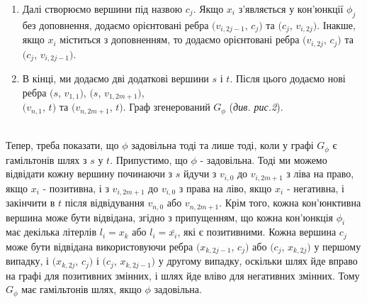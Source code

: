 \documentclass[14pt]{article}
\begin{document}
\begin{spacing}{1.175}
\begin{enumerate}
        \item  Далі створюємо вершини під назвою \(c_{j}\). Якщо \(x_i\) з'являється у кон'юнкції \(\phi_{j}\) без доповнення, додаємо орієнтовані ребра
        \((v_{i,2j-1}\), \(c_{j})\) та \((c_{j}\), \(v_{i,2j})\). Інакше, якщо \(x_i\) міститься з доповненням, то додаємо орієнтовані ребра \((v_{i,2j}\), \(c_{j})\) та \((c_{j}\), \(v_{i,2j-1})\).
        
        \item В кінці, ми додаємо дві додаткові вершини \(s\) і \(t\). Після цього додаємо нові ребра \((s\), \(v_{1,1})\), \((s\), \(v_{1,2m+1})\), \\\((v_{n,1}\), \(t)\) та \((v_{n,2m+1}\), \(t)\). Граф згенерований \(G_{\phi}\) (\textit{див. рис.2}).
    \end{enumerate}
    \\

    \quad Тепер, треба показати, що \(\phi\) задовільна тоді та лише тоді, коли у графі \(G_{\phi}\) є гамільтонів шлях з \(s\) у \(t\). Припустимо, що \(\phi\) - задовільна. Тоді ми можемо відвідати кожну вершину починаючи з \(s\) йдучи з \(v_{i,0}\) до \(v_{i,2m+1}\) з ліва на право, якщо \(x_i\) - позитивна, і з \(v_{i,2m+1}\) до \(v_{i,0}\) з права на ліво, якщо \(x_i\) - негативна, і закінчити в \(t\) після відвідування \(v_{n,0}\) або \(v_{n,2m+1}\). Крім того, кожна кон'юнктивна вершина може бути відвідана, згідно з припущенням, що кожна кон'юнкція \(\phi_{i}\) має декілька літерлів \(l_i = x_k\) або \(l_i = \bar{x_i}\), які є позитивними. Кожна вершина \(c_j\) може бути відвідана використовуючи ребра \((x_{k,2j-1}\), \(c_{j})\) або \((c_{j}\), \(x_{k,2j})\) у першому випадку, і \((x_{k,2j}\), \(c_{j})\) і \((c_{j}\), \(x_{k,2j-1})\) у другому випадку, оскільки шлях йде вправо на графі для позитивних змінних, і шлях йде вліво для негативних змінних. Тому \(G_{\phi}\) має гамільтонів шлях, якщо \(\phi\) задовільна.
    

\end{spacing}
\end{document}
